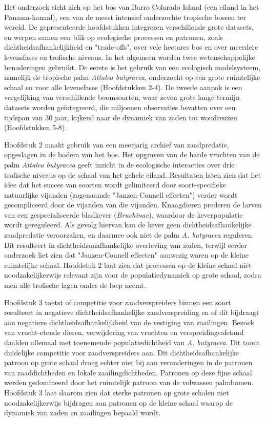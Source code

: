 \documentclass[b5paper,justified]{tufte-book} %
\begin{document}
\begin{fullwidth}
Het onderzoek richt zich op het bos van Barro Colorado Island (een eiland in het Panama-kanaal), een van de meest intensief onderzochte tropische bossen ter wereld. De gepresenteerde hoofdstukken integreren verschillende grote datasets, en werpen samen een blik op ecologische processen en patronen, zoals dichtheidsafhankelijkheid en "trade-offs", over vele hectares bos en over meerdere levensfases en trofische niveaus. In het algemeen worden twee wetenschappelijke benaderingen gebruikt. De eerste is het gebruik van een ecologisch modelsysteem, namelijk de tropische palm \textit{Attalea butyracea}, onderzocht op een grote ruimtelijke schaal en voor alle levensfases (Hoofdstukken 2-4). De tweede aanpak is een vergelijking van verschillende boomsoorten, waar zeven grote lange-termijn datasets worden ge\"integreerd, die miljoenen observaties bevatten over een tijdspan van 30 jaar, kijkend naar de dynamiek van zaden tot woudreuzen (Hoofdstukken 5-8). 

Hoofdstuk 2 maakt gebruik van een meerjarig archief van zaadpredatie, opgeslagen in de bodem van het bos. Het opgraven van de harde vruchten van de palm \textit{Attalea butyracea} geeft inzicht  in de ecologische interacties over drie trofische niveaus op de schaal van het gehele eiland. Resultaten laten zien dat het idee dat het succes van soorten wordt gelimiteerd door soort-specifieke natuurlijke vijanden (zogenaamde "Janzen-Connell effecten") verder wordt gecompliceerd door de vijanden van die vijanden. Knaagdieren prederen de larven van een gespecialiseerde bladkever (\textit{Bruchinae}), waardoor de keverpopulatie wordt gereguleerd. Als gevolg hiervan kan de kever geen dichtheidsafhankelijke zaadpredatie veroorzaken, en daarmee ook niet de palm \textit{A. butyracea} reguleren. Dit resulteert in dichtheidsonafhankelijke overleving van zaden, terwijl eerder onderzoek liet zien dat "Janzen-Connell effecten" aanwezig waren op de kleine ruimtelijke schaal. Hoofdstuk 2 laat zien dat processen op de kleine schaal niet noodzakelijkerwijs relevant zijn voor de populatiedynamiek op grote schaal, zodra men alle trofische lagen onder de loep neemt.

Hoofdstuk 3 toetst of competitie voor zaadverspreiders binnen een soort resulteert in negatieve dichtheidsafhankelijke zaadverspreiding en of dit bijdraagt aan negatieve dichtheidsafhankelijkheid van de vestiging van zaailingen. Bezoek van vrucht-etende dieren, verwijdering van vruchten en verspreidingsafstand daalden allemaal met toenemende populatiedichtheid van \textit{A. butyracea}. Dit toont duidelijke competitie voor zaadverspreiders aan. Dit dichtheidsafhankelijke patroon op grote schaal droeg echter niet bij aan veranderingen in de patronen van zaaddichtheden en lokale zaailingdichtheden. Patronen op deze fijne schaal werden gedomineerd door het ruimtelijk patroon van de volwassen palmbomen. Hoofdstuk 3 laat daarom zien dat sterke patronen op grote schalen niet noodzakelijkerwijs bijdragen aan patronen op de kleine schaal waarop de dynamiek van zaden en zaailingen bepaald wordt. 


\end{fullwidth}
\end{document}
